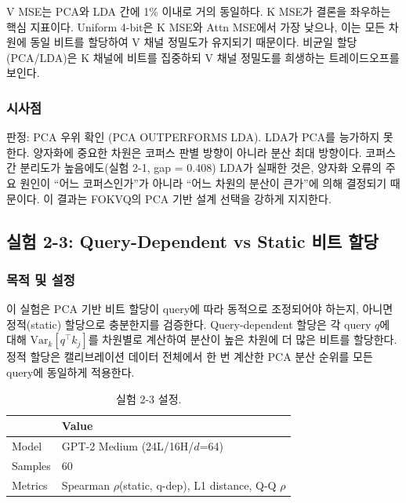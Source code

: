 \documentclass[11pt,a4paper]{article}
\begin{document}
V MSE는 PCA와 LDA 간에 1\% 이내로 거의 동일하다.
K MSE가 결론을 좌우하는 핵심 지표이다.
Uniform 4-bit은 K MSE와 Attn MSE에서 가장 낮으나, 이는 모든 차원에 동일 비트를 할당하여 V 채널 정밀도가 유지되기 때문이다.
비균일 할당(PCA/LDA)은 K 채널에 비트를 집중하되 V 채널 정밀도를 희생하는 트레이드오프를 보인다.

\subsubsection{시사점}

판정: \textcolor{success}{PCA 우위 확인 (PCA OUTPERFORMS LDA)}.
LDA가 PCA를 능가하지 못한다.
양자화에 중요한 차원은 코퍼스 판별 방향이 아니라 분산 최대 방향이다.
코퍼스 간 분리도가 높음에도(실험 2-1, gap = 0.408) LDA가 실패한 것은, 양자화 오류의 주요 원인이 ``어느 코퍼스인가''가 아니라 ``어느 차원의 분산이 큰가''에 의해 결정되기 때문이다.
이 결과는 FOKVQ의 PCA 기반 설계 선택을 강하게 지지한다.

\subsection{실험 2-3: Query-Dependent vs Static 비트 할당}

\subsubsection{목적 및 설정}

이 실험은 PCA 기반 비트 할당이 query에 따라 동적으로 조정되어야 하는지, 아니면 정적(static) 할당으로 충분한지를 검증한다.
Query-dependent 할당은 각 query $q$에 대해 $\mathrm{Var}_{k}[q^\top k_j]$를 차원별로 계산하여 분산이 높은 차원에 더 많은 비트를 할당한다.
정적 할당은 캘리브레이션 데이터 전체에서 한 번 계산한 PCA 분산 순위를 모든 query에 동일하게 적용한다.

\begin{table}[H]
\centering
\caption{실험 2-3 설정.}
\label{tab:exp23_setup}
\begin{tabular}{ll}
\toprule
\textbf{} & \textbf{Value} \\
\midrule
Model & GPT-2 Medium (24L/16H/$d$=64) \\
Samples & 60 \\
Metrics & Spearman $\rho$(static, q-dep), L1 distance, Q-Q $\rho$ \\
\bottomrule
\end{tabular}
\end{table}
\end{document}
